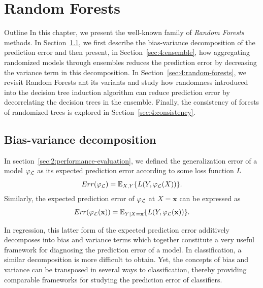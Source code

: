 \chapter{Random Forests}\label{ch:forest}

\begin{remark}{Outline}
In this chapter, we present the well-known family of \textit{Random Forests}
methods. In Section~\ref{sec:4:bias-variance}, we first describe the
bias-variance decomposition of the prediction error and then present, in
Section~\ref{sec:4:ensemble}, how aggregating randomized models through
ensembles reduces the prediction error by decreasing the variance term in this
decomposition. In Section~\ref{sec:4:random-forests}, we revisit Random Forests ant its variants and
study how randomness introduced into the decision tree induction algorithm can
reduce prediction error by decorrelating the decision trees in the ensemble.
Finally, the consistency of forests of randomized trees is explored in
Section~\ref{sec:4:consistency}.
\end{remark}


\section{Bias-variance decomposition}
\label{sec:4:bias-variance}

In section~\ref{sec:2:performance-evaluation}, we defined the generalization
error of a model $\varphi_{\cal L}$ as its expected prediction error
according to some loss function $L$
\begin{equation}
Err(\varphi_{\cal L}) = \mathbb{E}_{X,Y} \{ L(Y, \varphi_{\cal L}(X)) \}.
\end{equation}
Similarly, the expected prediction error of $\varphi_{\cal L}$ at $X=\mathbf{x}$
can be expressed as
\begin{equation}
Err(\varphi_{\cal L}(\mathbf{x})) = \mathbb{E}_{Y|X=\mathbf{x}} \{ L(Y, \varphi_{\cal L}(\mathbf{x})) \}.\label{eqn:4:generalization-error:x}
\end{equation}

In regression, this latter form of the expected prediction error additively
decomposes into bias and variance terms which together constitute a very useful
framework for diagnosing the prediction error of a model. In classification, a
similar decomposition is more difficult to obtain. Yet, the
concepts of bias and variance can be transposed in several ways to
classification, thereby providing comparable frameworks for studying the
prediction error of classifiers.


